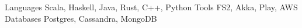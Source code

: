 \begin{cvskills}
  \cvskill
    {Languages}
    {Scala, Haskell, Java, Rust, C++, Python}
  \cvskill
    {Tools}
    {FS2, Akka, Play, AWS}
  \cvskill
    {Databases}
    {Postgres, Cassandra, MongoDB}
\end{cvskills}

